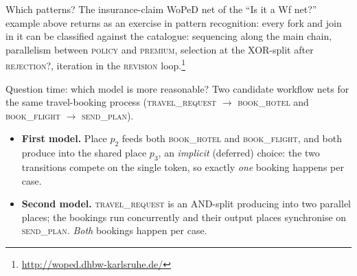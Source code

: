\begin{examplebox}{Which patterns?}
The insurance-claim WoPeD net of the ``Is it a Wf net?'' example above returns as an exercise in pattern recognition: every fork and join in it can be classified against the catalogue: sequencing along the main chain, parallelism between \textsc{policy} and \textsc{premium}, selection at the XOR-split after \textsc{rejection?}, iteration in the \textsc{revision} loop.\footnote{\url{http://woped.dhbw-karlsruhe.de/}}
\end{examplebox}

\begin{examplebox}{Question time: which model is more reasonable?}
Two candidate workflow nets for the same travel-booking process (\textsc{travel\_request} $\to$ \textsc{book\_hotel} and \textsc{book\_flight} $\to$ \textsc{send\_plan}).

\begin{itemize}
  \item \textbf{First model.} Place $p_2$ feeds both \textsc{book\_hotel} and \textsc{book\_flight}, and both produce into the shared place $p_3$, an \emph{implicit} (deferred) choice: the two transitions compete on the single token, so exactly \emph{one} booking happens per case.
  \item \textbf{Second model.} \textsc{travel\_request} is an AND-split producing into two parallel places; the bookings run concurrently and their output places synchronise on \textsc{send\_plan}. \emph{Both} bookings happen per case.
\end{itemize}

\medskip
\begin{center}


\end{center}
\end{examplebox}
